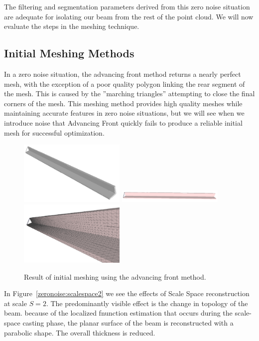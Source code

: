 \documentclass[12pt]{drexelthesis}
\let\Oldsubsection\subsection
\renewcommand{\subsection}{\FloatBarrier\Oldsubsection}
\begin{document}
The filtering and segmentation parameters derived from this zero noise situation are adequate for isolating our beam from the rest of the point cloud. We will now evaluate the steps in the meshing technique.


\subsection{Initial Meshing Methods}
In a zero noise situation, the advancing front method returns a nearly perfect mesh, with the exception of a poor quality polygon linking the rear segment of the mesh. This is caused by the ''marching triangles'' attempting to close the final corners of the mesh. This meshing method provides high quality meshes while maintaining accurate features in zero noise situations, but we will see when we introduce noise that Advancing Front quickly fails to produce a reliable initial mesh for successful optimization.

\begin{figure}[!ht]
	
	\centering
		\includegraphics[width=2in]{simulated-lab-scan/0noise/clean/advancingfront.png}
		\includegraphics[width=2in]{simulated-lab-scan/0noise/clean/advancingfront01.png}
		\includegraphics[width=2in]{simulated-lab-scan/0noise/clean/advancingfront02.png}
		\caption[Initial meshing using a raw advancing front approach]{\centering  Result of initial meshing using the advancing front method.}
		\label{zeronoise:advancingfront}
\end{figure}

In Figure~\ref{zeronoise:scalespace2} we see the effects of Scale Space reconstruction at scale $S = 2$. The predominantly visible effect is the change in topology of the beam. because of the localized fnunction estimation that occurs during the scale-space casting phase, the planar surface of the beam is reconstructed with a parabolic shape. The overall thickness is reduced.
\end{document}
